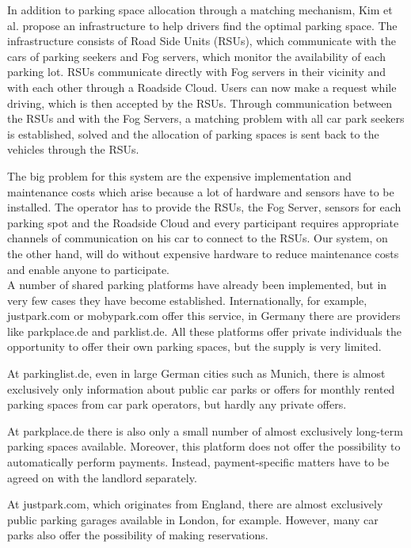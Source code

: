 \documentclass[
a4paper,     %
titlepage,   %
14pt         %
]{scrartcl}  %
\theoremstyle{mystyle}
\begin{document}
In addition to parking space allocation through a matching mechanism, Kim et al. \cite{Kim2015ASP} propose an infrastructure to help drivers find the optimal parking space. The infrastructure consists of Road Side Units (RSUs), which communicate with the cars of parking seekers and Fog servers, which monitor the availability of each parking lot. RSUs communicate directly with Fog servers in their vicinity and with each other through a Roadside Cloud. Users can now make a request while driving, which is then accepted by the RSUs. Through communication between the RSUs and with the Fog Servers, a matching problem with all car park seekers is established, solved and the allocation of parking spaces is sent back to the vehicles through the RSUs. 

The big problem for this system are the expensive implementation and maintenance costs which arise because a lot of hardware and sensors have to be installed. The operator has to provide the RSUs, the Fog Server, sensors for each parking spot and the Roadside Cloud and every participant requires appropriate channels of communication on his car to connect to the RSUs. Our system, on the other hand, will do without expensive hardware to reduce maintenance costs and enable anyone to participate.\\


A number of shared parking platforms have already been implemented, but in very few cases they have become established. Internationally, for example, justpark.com or mobypark.com offer this service, in Germany there are providers like parkplace.de and parklist.de. All these platforms offer private individuals the opportunity to offer their own parking spaces, but the supply is very limited.

At parkinglist.de, even in large German cities such as Munich, there is almost exclusively only information about public car parks or offers for monthly rented parking spaces from car park operators, but hardly any private offers.

At parkplace.de there is also only a small number of almost exclusively long-term parking spaces available. Moreover, this platform does not offer the possibility to automatically perform payments. Instead, payment-specific matters have to be agreed on with the landlord separately.

At justpark.com, which originates from England, there are almost exclusively public parking garages available in London, for example. However, many car parks also offer the possibility of making reservations.
\end{document}
